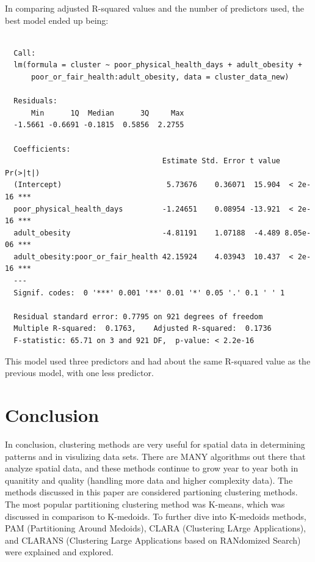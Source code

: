\documentclass[12pt,twoside]{amherstthesis}
\begin{document}
  In comparing adjusted R-squared values and the number of predictors
  used, the best model ended up being:
  
  \begin{Shaded}
  \begin{Highlighting}[]
  \end{Highlighting}
  \end{Shaded}
  
  \begin{verbatim}
  
  Call:
  lm(formula = cluster ~ poor_physical_health_days + adult_obesity + 
      poor_or_fair_health:adult_obesity, data = cluster_data_new)
  
  Residuals:
      Min      1Q  Median      3Q     Max 
  -1.5661 -0.6691 -0.1815  0.5856  2.2755 
  
  Coefficients:
                                    Estimate Std. Error t value Pr(>|t|)    
  (Intercept)                        5.73676    0.36071  15.904  < 2e-16 ***
  poor_physical_health_days         -1.24651    0.08954 -13.921  < 2e-16 ***
  adult_obesity                     -4.81191    1.07188  -4.489 8.05e-06 ***
  adult_obesity:poor_or_fair_health 42.15924    4.03943  10.437  < 2e-16 ***
  ---
  Signif. codes:  0 '***' 0.001 '**' 0.01 '*' 0.05 '.' 0.1 ' ' 1
  
  Residual standard error: 0.7795 on 921 degrees of freedom
  Multiple R-squared:  0.1763,    Adjusted R-squared:  0.1736 
  F-statistic: 65.71 on 3 and 921 DF,  p-value: < 2.2e-16
  \end{verbatim}
  
  This model used three predictors and had about the same R-squared value
  as the previous model, with one less predictor.
  
  \chapter*{Conclusion}\label{conclusion}
  
  \setcounter{chapter}{4} \setcounter{section}{0}
  
  In conclusion, clustering methods are very useful for spatial data in
  determining patterns and in visulizing data sets. There are MANY
  algorithms out there that analyze spatial data, and these methods
  continue to grow year to year both in quanitity and quality (handling
  more data and higher complexity data). The methods discussed in this
  paper are considered partioning clustering methods. The most popular
  partitioning clustering method was K-means, which was discussed in
  comparison to K-medoids. To further dive into K-medoids methods, PAM
  (Partitioning Around Medoids), CLARA (Clustering LArge Applications),
  and CLARANS (Clustering Large Applications based on RANdomized Search)
  were explained and explored.
  
\end{document}
